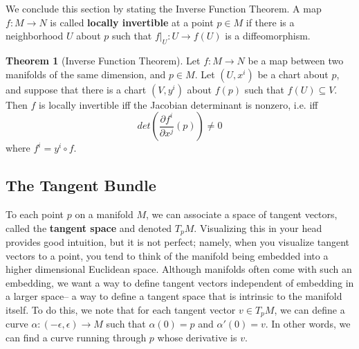 \documentclass[11pt, oneside]{article}   	%
\theoremstyle{definition}
\newtheorem{theorem}{Theorem}[section]
\begin{document}
We conclude this section by stating the Inverse Function Theorem. A map $f : M\rightarrow N$ is called \textbf{locally 
invertible} at a point $p\in M$ if there is a neighborhood $U$ about $p$ such that $f|_U : U\rightarrow f(U)$ is a 
diffeomorphism. 
\begin{theorem}[Inverse Function Theorem]
	Let $f : M\rightarrow N$ be a map between two manifolds of the same dimension, and $p\in M$. Let $(U, x^i)$ be a 
	chart about $p$, and suppose that there is a chart $(V, y^i)$ about $f(p)$ such that $f(U)\subseteq V$. Then $f$ is 
	locally invertible iff the Jacobian determinant is nonzero, i.e. iff
	\begin{equation}
		det\left(\frac{\partial f^i}{\partial x^j}(p)\right)\neq 0
	\end{equation}
	where $f^i = y^i\circ f$. 
\end{theorem}

\subsection{The Tangent Bundle}

To each point $p$ on a manifold $M$, we can associate a space of tangent vectors, called the \textbf{tangent space} 
and denoted $T_p M$. Visualizing this in your head provides good intuition, but it is not perfect; namely, when you 
visualize tangent vectors to a point, you tend to think of the manifold being embedded into a higher dimensional Euclidean 
space. Although manifolds often come with such an embedding, we want a way to define tangent vectors independent of 
embedding in a larger space-- a way to define a tangent space that is intrinsic to the manifold itself. To do this, we note 
that for each tangent vector $v\in T_p M$, we can define a curve $\alpha : (-\epsilon, \epsilon)\rightarrow M$ such that 
$\alpha(0) = p$ and $\alpha'(0) = v$. In other words, we can find a curve running through $p$ whose derivative is $v$. 
\end{document}
